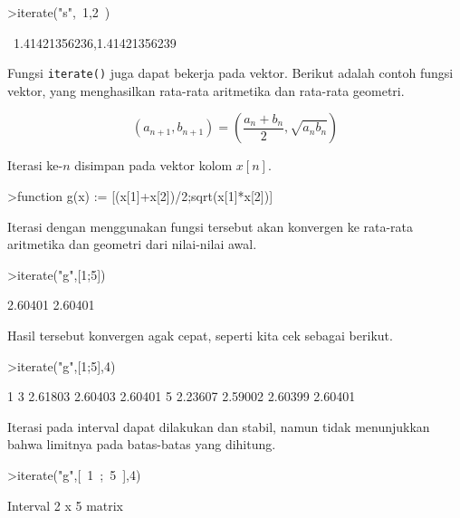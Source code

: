 \documentclass[a4paper,11pt,oneside,enabledeprecatedfontcommands]{scrbook}
\newenvironment{eulernotebook}{}{}
\newenvironment{eulercomment}{\par\medskip\noindent}{\par\medskip}
\newenvironment{eulerformula}{}{}
\begin{document}
\begin{eulernotebook}
\begin{eulerprompt}
>iterate("s",~1,2~)
\end{eulerprompt}
\begin{euleroutput}
  ~1.41421356236,1.41421356239~
\end{euleroutput}
\begin{eulercomment}
Fungsi \texttt{iterate()} juga dapat bekerja pada vektor. Berikut adalah contoh fungsi vektor, yang menghasilkan rata-rata aritmetika dan rata-rata geometri.
\end{eulercomment}
\begin{eulerformula}
\[
(a_{n+1},b_{n+1}) = \left( \frac{a_n+b_n}{2}, \sqrt{a_nb_n} \right)
\]
\end{eulerformula}
\begin{eulercomment}
Iterasi ke-$n$ disimpan pada vektor kolom $x[n]$.
\end{eulercomment}
\begin{eulerprompt}
>function g(x) := [(x[1]+x[2])/2;sqrt(x[1]*x[2])]
\end{eulerprompt}
\begin{eulercomment}
Iterasi dengan menggunakan fungsi tersebut akan konvergen ke rata-rata aritmetika dan geometri dari nilai-nilai awal.
\end{eulercomment}
\begin{eulerprompt}
>iterate("g",[1;5])
\end{eulerprompt}
\begin{euleroutput}
        2.60401 
        2.60401 
\end{euleroutput}
\begin{eulercomment}
Hasil tersebut konvergen agak cepat, seperti kita cek sebagai berikut.
\end{eulercomment}
\begin{eulerprompt}
>iterate("g",[1;5],4)
\end{eulerprompt}
\begin{euleroutput}
              1             3       2.61803       2.60403       2.60401 
              5       2.23607       2.59002       2.60399       2.60401 
\end{euleroutput}
\begin{eulercomment}
Iterasi pada interval dapat dilakukan dan stabil, namun tidak menunjukkan bahwa limitnya pada batas-batas yang dihitung.
\end{eulercomment}
\begin{eulerprompt}
>iterate("g",[~1~;~5~],4)
\end{eulerprompt}
\begin{euleroutput}
  Interval 2 x 5 matrix
  

\end{euleroutput}
\end{eulernotebook}
\end{document}
